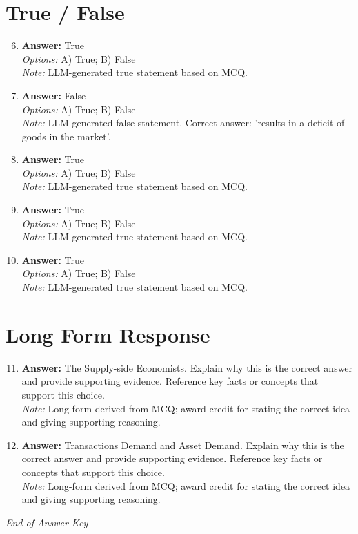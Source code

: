 \documentclass[12pt]{article}
\begin{document}
\section*{True / False}
\begin{enumerate}[label=\arabic*.]
\setcounter{enumi}{5}
\item \textbf{Answer:} True
\\ \textit{Options:} A) True; B) False
\\ \textit{Note:} LLM-generated true statement based on MCQ.
\item \textbf{Answer:} False
\\ \textit{Options:} A) True; B) False
\\ \textit{Note:} LLM-generated false statement. Correct answer: 'results in a deficit of goods in the market'.
\item \textbf{Answer:} True
\\ \textit{Options:} A) True; B) False
\\ \textit{Note:} LLM-generated true statement based on MCQ.
\item \textbf{Answer:} True
\\ \textit{Options:} A) True; B) False
\\ \textit{Note:} LLM-generated true statement based on MCQ.
\item \textbf{Answer:} True
\\ \textit{Options:} A) True; B) False
\\ \textit{Note:} LLM-generated true statement based on MCQ.
\end{enumerate}

\section*{Long Form Response}
\begin{enumerate}[label=\arabic*.]
\setcounter{enumi}{10}
\item \textbf{Answer:} The Supply-side Economists. Explain why this is the correct answer and provide supporting evidence. Reference key facts or concepts that support this choice.
\\ \textit{Note:} Long-form derived from MCQ; award credit for stating the correct idea and giving supporting reasoning.
\item \textbf{Answer:} Transactions Demand and Asset Demand. Explain why this is the correct answer and provide supporting evidence. Reference key facts or concepts that support this choice.
\\ \textit{Note:} Long-form derived from MCQ; award credit for stating the correct idea and giving supporting reasoning.
\end{enumerate}

\vfill
\noindent\textit{End of Answer Key}
\end{document}
